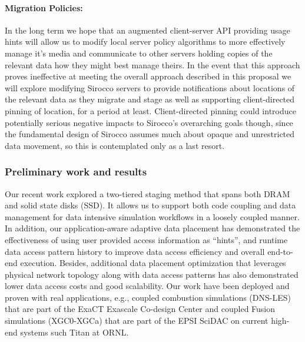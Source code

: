 \paragraph{Migration Policies:}
In the long term we hope that an
augmented client-server API providing usage hints will allow us to modify local
server policy algorithms to more effectively manage it's media and communicate
to other servers holding copies of the relevant data how they might best manage
theirs. In the event that this approach proves ineffective at meeting the
overall approach described in this proposal we will explore modifying Sirocco
servers to provide notifications about locations of the relevant data as they
migrate and stage as well as supporting client-directed pinning of location,
for a period at least. Client-directed pinning could introduce potentially
serious negative impacts to Sirocco's overarching goals though, since the
fundamental design of Sirocco assumes much about opaque and unrestricted data
movement, so this is contemplated only as a last resort.

\subsubsection{Preliminary work and results} 
\label{sec:prework}

Our recent work \cite{tongipdps15}
explored a two-tiered staging method that spans both DRAM and solid state
disks (SSD). It allows us to support both code coupling and data management
for data intensive simulation workflows in a loosely coupled manner. In
addition, our application-aware adaptive data placement has demonstrated the
effectiveness of using user provided access information as ``hints'', and
runtime data access pattern history to improve data access efficiency and
overall end-to-end execution. Besides, additional data placement
optimization \cite{qiansc15} that leverages physical network topology along
with data access patterns has also demonstrated lower data access costs and
good scalability. Our work have been deployed and proven with real
applications, e.g., coupled combustion simulations (DNS-LES) that are part
of the ExaCT Exascale Co-design Center and coupled Fusion simulations
(XGC0-XGCa) that are part of the EPSI SciDAC on current high-end systems
such Titan at ORNL. 


